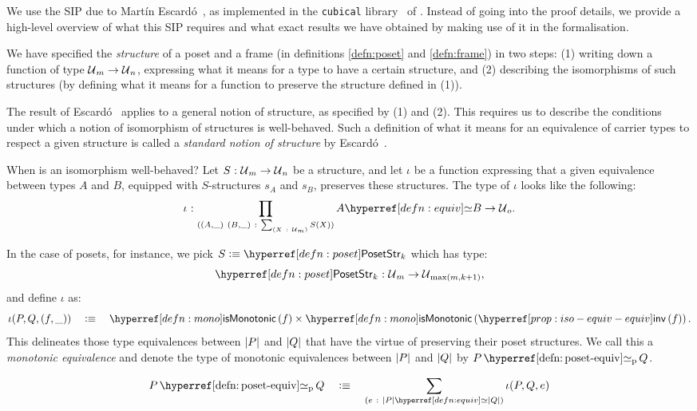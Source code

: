 We use the SIP due to Martín Escardó~\cite{escardo-uf-intro}, as implemented in the
\texttt{cubical} library~\cite{agda-cubical} of \veragda{}. Instead of going into the
proof details, we provide a high-level overview of what this SIP requires and what exact
results we have obtained by making use of it in the \veragda{} formalisation.

We have specified the \emph{structure} of a poset and a frame (in definitions
\ref{defn:poset} and \ref{defn:frame}) in two steps: (1) writing down a function of type
$\mathcal{U}{}_m \rightarrow \mathcal{U}{}_n$, expressing what it means for a type to have a certain structure,
and (2) describing the isomorphisms of such structures (by defining what it means for a
function to preserve the structure defined in (1)).

The result of Escardó~\cite{escardo-uf-intro} applies to a general notion of structure, as
specified by (1) and (2). This requires us to describe the conditions under which a notion
of isomorphism of structures is well-behaved. Such a definition of what it means for an
equivalence of carrier types to respect a given structure is called a \emph{standard
  notion of structure} by Escard\'{o}~\cite{escardo-uf-intro}.

When is an isomorphism well-behaved? Let $S\hspace{0.1mm}:\hspace{0.1mm}\mathcal{U}{}_m \rightarrow \mathcal{U}{}_n$ be a
structure, and let $\iota$ be a function expressing that a given equivalence between types $A$
and $B$, equipped with $S$-structures $s_A$ and $s_B$, preserves these structures. The
type of $\iota$ looks like the following:
\begin{equation*}
  \oftyI{\iota}{%
    \pity{(A , \_)~(B , \_)}{\sigmaty{X}{\univ{}_m}{S(X)}}{%
      \typequiv{A}{B} \rightarrow \univ{}_o
    }
  }.
\end{equation*}

In the case of posets, for instance, we pick $S \is \posetstrnm{}_k$ which has type:
\begin{equation*}
  \oftyI{\posetstrnm{}_k}{\univ{}_m \rightarrow \univ{}_{\max(m, k+1)}},
\end{equation*}
and define $\iota$ as:
\begin{equation*}
  \iota(P, Q, (f , \_)) \quad\is\quad \ismonotonic{f} \times \ismonotonic{\invequiv{f}}  .
\end{equation*}
This delineates those type equivalences between $\left| P \right|$ and $\left| Q \right|$ that have the
virtue of preserving their poset structures. We call this a \emph{monotonic equivalence}
and denote the type of monotonic equivalences between $\left| P \right|$ and $\left| Q \right|$ by
$\posetequiv{P}{Q}$.
\begin{defn}\label{defn:poset-equiv}
  \begin{equation*}
    \posetequiv{P}{Q} \quad\is\quad \sigmaty{e}{\typequiv{\abs{P}}{\abs{Q}}}{\iota(P, Q, e)}
  \end{equation*}
\end{defn}

